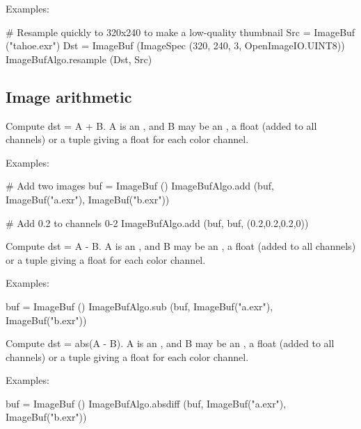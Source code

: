 \smallskip
\noindent Examples:
\begin{code}
    # Resample quickly to 320x240 to make a low-quality thumbnail
    Src = ImageBuf ("tahoe.exr")
    Dst = ImageBuf (ImageSpec (320, 240, 3, OpenImageIO.UINT8))
    ImageBufAlgo.resample (Dst, Src)
\end{code}
\apiend



\subsection{Image arithmetic}
\label{sec:iba:py:arith}

 

Compute {\cf dst = A + B}.  {\cf A} is an \ImageBuf, and {\cf B}  may
be an \ImageBuf, a {\cf float} (added to all channels) or a tuple giving a
{\cf float} for each color channel.

\smallskip
\noindent Examples:
\begin{code}
    # Add two images
    buf = ImageBuf ()
    ImageBufAlgo.add (buf, ImageBuf("a.exr"), ImageBuf("b.exr"))

    # Add 0.2 to channels 0-2 
    ImageBufAlgo.add (buf, buf, (0.2,0.2,0.2,0))
\end{code}
\apiend


 

Compute {\cf dst = A - B}.  {\cf A} is an \ImageBuf, and {\cf B}  may
be an \ImageBuf, a {\cf float} (added to all channels) or a tuple giving a
{\cf float} for each color channel.

\smallskip
\noindent Examples:
\begin{code}
    buf = ImageBuf ()
    ImageBufAlgo.sub (buf, ImageBuf("a.exr"), ImageBuf("b.exr"))
\end{code}
\apiend


 
\NEW %

Compute {\cf dst = abs(A - B)}.  {\cf A} is an \ImageBuf, and {\cf B}  may
be an \ImageBuf, a {\cf float} (added to all channels) or a tuple giving a
{\cf float} for each color channel.

\smallskip
\noindent Examples:
\begin{code}
    buf = ImageBuf ()
    ImageBufAlgo.absdiff (buf, ImageBuf("a.exr"), ImageBuf("b.exr"))
\end{code}
\apiend


